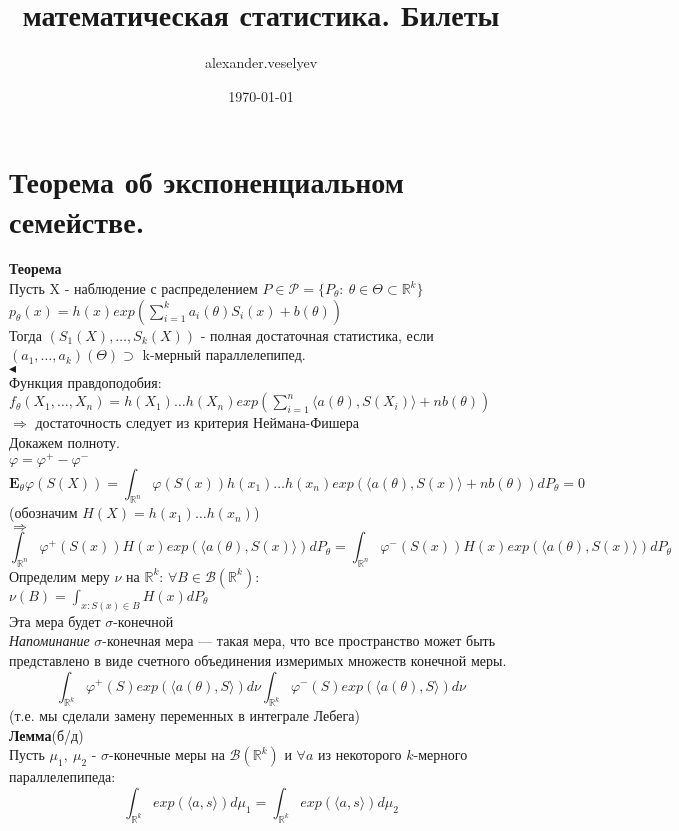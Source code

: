 \documentclass{article}
\title{математическая статистика. Билеты}
\author{alexander.veselyev }
\date{\today}
\begin{document}
\section{Теорема об экспоненциальном семействе.}
\textbf{Теорема}\\
Пусть X - наблюдение с распределением $P\in\mathcal{P}=\{P_\theta:\ \theta\in\Theta\subset\mathbb{R}^k\}$\\
$p_\theta(x) = h(x)exp(\sum_{i=1}^k{a_i(\theta)S_i(x)} + b(\theta))$\\
Тогда $(S_1(X),\dots,S_k(X))$ - полная достаточная статистика, если\\ $(a_1,\dots,a_k)(\Theta) \supset$ k-мерный параллелепипед.\\
$\blacktriangleleft$\\
Функция правдоподобия: \\$f_\theta(X_1,\dots,X_n) = h(X_1)\dots h(X_n)exp(\sum_{i=1}^n{\langle a(\theta), S(X_i)\rangle} + nb(\theta))$\\
$\Rightarrow$ достаточность следует из критерия Неймана-Фишера\\
Докажем полноту.\\
$\varphi = \varphi^+ - \varphi^-$
$$\mathbf{E}_\theta\varphi(S(X)) = \int_{\mathbb{R}^n}\varphi(S(x))h(x_1)\dots h(x_n)exp(\langle a(\theta), S(x)\rangle + nb(\theta))dP_\theta = 0$$
(обозначим $H(X) = h(x_1)\dots h(x_n)$)\\
$\Rightarrow$
$$ \int_{\mathbb{R}^n}{\varphi^+(S(x))H(x)exp(\langle a(\theta), S(x)\rangle)dP_\theta} = \int_{\mathbb{R}^n}{\varphi^-(S(x))H(x)exp(\langle a(\theta), S(x)\rangle)dP_\theta}  $$
Определим меру $\nu$ на $\mathbb{R}^k$: $\forall B \in \mathcal{B}(\mathbb{R}^k):$\\
$\nu(B) = \int_{x: S(x)\in B}{H(x)dP_\theta} $\\
Эта мера будет $\sigma$-конечной\\
\textit{Напоминание} $\sigma$-конечная мера --- такая мера, что все пространство может быть представлено в виде счетного объединения измеримых множеств конечной меры.\\
$$ \int_{\mathbb{R}^k}{\varphi^+(S)exp(\langle a(\theta), S \rangle)d\nu}  \int_{\mathbb{R}^k}{\varphi^-(S)exp(\langle a(\theta), S \rangle)d\nu}$$
(т.е. мы сделали замену переменных в интеграле Лебега)\\
\textbf{Лемма}(б/д)\\
Пусть $\mu_1,\ \mu_2$ - $\sigma$-конечные меры на $\mathcal{B}(\mathbb{R}^k)$ и $\forall a$ из некоторого $k$-мерного параллелепипеда:
$$ \int_{\mathbb{R}^k}{exp(\langle a, s  \rangle)d\mu_1} = \int_{\mathbb{R}^k}{exp(\langle a, s  \rangle)d\mu_2} $$
\end{document}
